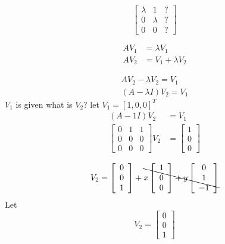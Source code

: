 \documentclass[12pt,a4paper]{article}
\begin{document}
$$
\left[\begin{array}{lll}
{\lambda} & {1} & ?\\ 
{0} & {\lambda}&  ?\\ 
{0} & {0} &? 
\end{array}\right]
$$

\begin{align*}
A V_{1}&=\lambda V_{1} \\
 A V_{2}&=V_{1}+\lambda V_{2}
\end{align*}

\begin{equation*}
\begin{array}{l}{A V_{2}-\lambda V_{2}=V_{1}} \\ {(A-\lambda I) V_{2}=V_{1}}\end{array}
\end{equation*}
$V_1$ is given what is $V_2$? let $V_1=[1,0,0]^T$
\begin{align*}
(A-1 I) V_{2}&=V_{1}\\
\left[\begin{array}{lll}{0} & {1} & {1} \\ {0} & {0} & {0} \\ {0} & {0} & {0}\end{array}\right] V_{2}&=\left[\begin{array}{l}{1} \\ {0} \\ {0}\end{array}\right]
\end{align*}

\begin{equation}
V_{2}=\left[\begin{array}{l}{0} \\ {0} \\ {1}\end{array}\right]+\bcancel{x\left[\begin{array}{l}{1} \\ {0} \\ {0}\end{array}\right]+y\left[\begin{array}{c}{0} \\ {1} \\ {-1}\end{array}\right]}
\end{equation}
Let 
\begin{equation}
V_{2}=\left[\begin{array}{l}{0} \\ {0} \\ {1}\end{array}\right]
\end{equation}
\end{document}

